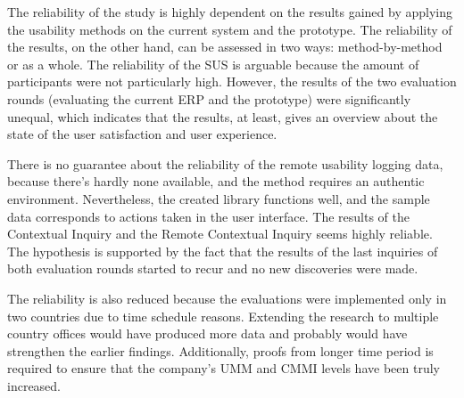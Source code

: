 \documentclass[12pt,a4paper,oneside,pdftex]{report}
\begin{document}
The reliability of the study is highly dependent on the results gained by applying the usability methods on the current system and the prototype. The reliability of the results, on the other hand, can be assessed in two ways: method-by-method or as a whole. The reliability of the SUS is arguable because the amount of participants were not particularly high. However, the results of the two evaluation rounds (evaluating the current ERP and the prototype) were significantly unequal, which indicates that the results, at least, gives an overview about the state of the user satisfaction and user experience. 

There is no guarantee about the reliability of the remote usability logging data, because there's hardly none available, and the method requires an authentic environment. Nevertheless, the created library functions well, and the sample data corresponds to actions taken in the user interface. The results of the Contextual Inquiry and the Remote Contextual Inquiry seems highly reliable. The hypothesis is supported by the fact that the results of the last inquiries of both evaluation rounds started to recur and no new discoveries were made. 

The reliability is also reduced because the evaluations were implemented only in two countries due to time schedule reasons. Extending the research to multiple country offices would have produced more data and probably would have strengthen the earlier findings. Additionally, proofs from longer time period is required to ensure that the company's UMM and CMMI levels have been truly increased.
\end{document}

